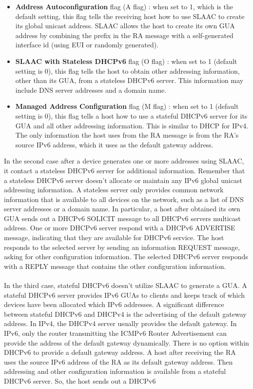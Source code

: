 \documentclass[11pt]{article}
\begin{document}
\begin{itemize}
\item \textbf{Address Autoconfiguration} flag (A flag) : when set to 1, which is the default setting, this flag tells the receiving host how to use SLAAC to create its global unicast address. SLAAC allows the host to create its own GUA address by combining the prefix in the RA message with a self-generated interface id (using EUI or randomly generated).
\item \textbf{SLAAC with Stateless DHCPv6} flag (O flag) : when set to 1 (default setting is 0), this flag tells the host to obtain other addressing information, other than its GUA, from a stateless DHCPv6 server. This information may include DNS server addresses and a domain name. 
\item \textbf{Managed Address Configuration} flag (M flag) : when set to 1 (default setting is 0), this flag tells a host how to use a stateful DHCPv6 server for its GUA and all other addressing information. This is similar to DHCP for IPv4. The only information the host uses from the RA message is from the RA's source IPv6 address, which it uses as the default gateway address.
\end{itemize}
In the second case after a device generates one or more addresses using SLAAC, it contact a stateless DHCPv6 server for additional information. Remember that a stateless DHCPv6 server doesn't allocate or maintain any IPv6 global unicast addressing information. A stateless server only provides common network information that is available to all devices on the network, such as a list of DNS server addresses or a domain name. In particular, a host after obtained its own GUA sends out a DHCPv6 SOLICIT message to all DHCPv6 servers multicast address. One or more DHCPv6 server respond with a DHCPv6 ADVERTISE message, indicating that they are available for DHCPv6 service. The host responds to the selected server by sending an information REQUEST message, asking for other configuration  information. The selected DHCPv6 server responds with a REPLY message that contains the other configuration information.\\\\In the third case, stateful DHCPv6 doesn't utilize SLAAC to generate a GUA. A stateful DHCPv6 server provides IPv6 GUAs to clients and keeps track of which devices have been allocated which IPv6 addresses. A significant difference between stateful DHCPv6 and DHCPv4 is the advertising of the default gateway address. In IPv4, the DHCPv4 server usually provides the default gateway. In IPv6, only the router transmitting the ICMPv6 Router Advertisement can provide the address of the default gateway dynamically. There is no option within DHCPv6 to provide a default gateway address. A host after receiving the RA uses the source IPv6 address of the RA as its default gateway address. Then addressing and other configuration information is available from a stateful DHCPv6 server. So, the host sends out a DHCPv6
\end{document}
